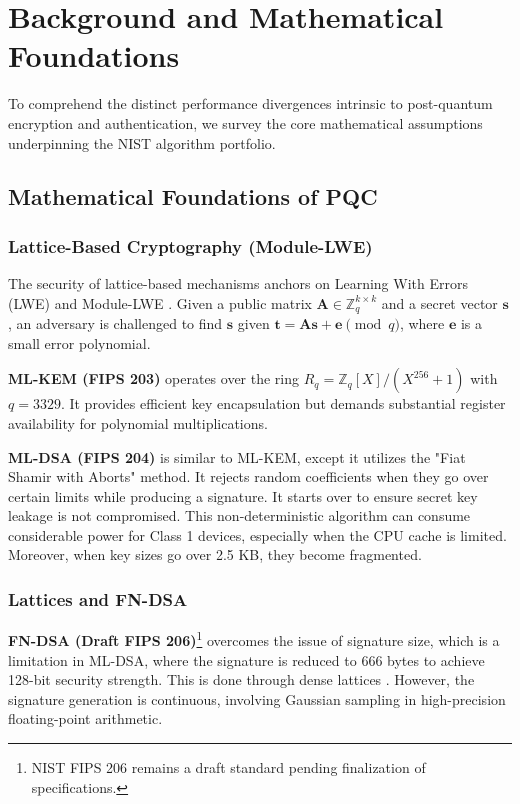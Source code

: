 \section{Background and Mathematical Foundations}
\label{sec:background}

To comprehend the distinct performance divergences intrinsic to post-quantum encryption and authentication, we survey the core mathematical assumptions underpinning the NIST algorithm portfolio.

\subsection{Mathematical Foundations of PQC}

\subsubsection{Lattice-Based Cryptography (Module-LWE)}
The security of lattice-based mechanisms anchors on Learning With Errors (LWE) and Module-LWE \cite{regev2009lattices}. Given a public matrix $\mathbf{A} \in \mathbb{Z}_q^{k \times k}$ and a secret vector $\mathbf{s}$, an adversary is challenged to find $\mathbf{s}$ given $\mathbf{t} = \mathbf{A}\mathbf{s} + \mathbf{e} \pmod q$, where $\mathbf{e}$ is a small error polynomial. 

\textbf{ML-KEM (FIPS 203)} operates over the ring $R_q = \mathbb{Z}_q[X]/(X^{256} + 1)$ with $q = 3329$. It provides efficient key encapsulation but demands substantial register availability for polynomial multiplications. 

\textbf{ML-DSA (FIPS 204)} is similar to ML-KEM, except it utilizes the "Fiat Shamir with Aborts" method. It rejects random coefficients when they go over certain limits while producing a signature. It starts over to ensure secret key leakage is not compromised. This non-deterministic algorithm can consume considerable power for Class 1 devices, especially when the CPU cache is limited. Moreover, when key sizes go over 2.5 KB, they become fragmented.

\subsubsection{\ntru{} Lattices and FN-DSA}
\textbf{FN-DSA (Draft FIPS 206)}\footnote{NIST FIPS 206 remains a draft standard pending finalization of specifications.} overcomes the issue of signature size, which is a limitation in ML-DSA, where the signature is reduced to 666 bytes to achieve 128-bit security strength. This is done through dense lattices \cite{hoffstein1998ntru}. However, the signature generation is continuous, involving Gaussian sampling in high-precision floating-point arithmetic. 

